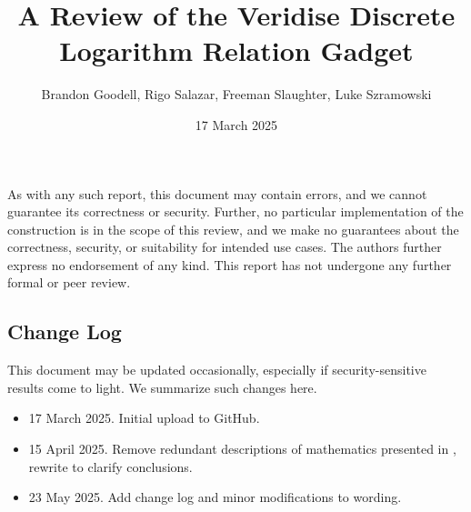 \documentclass{article}
\title{A Review of the Veridise Discrete Logarithm Relation Gadget}
\author{Brandon Goodell, Rigo Salazar, Freeman Slaughter, Luke Szramowski
}
\affil{$\mathsf{Cypher \ Stack}$}
\date{17 March 2025}
\theoremstyle{definition}
\newcommand{\6}{\mathbf}
\newcommand{\7}{\mathcal}
\begin{document}
\maketitle





As with any such report, this document may contain errors, and we cannot guarantee its correctness or security. 
Further, no particular implementation of the construction is in the scope of this review, and we make no guarantees about the correctness, security, or suitability for intended use cases.
The authors further express no endorsement of any kind. 
This report has not undergone any further formal or peer review.


\tableofcontents

\subsection*{Change Log}

This document may be updated occasionally, especially if security-sensitive results come to light. We summarize such changes here.
\begin{itemize}
\item 17 March 2025. Initial upload to GitHub.
\item 15 April 2025. Remove redundant descriptions of mathematics presented in \cite{BassaSoundnessIPDL}, rewrite to clarify conclusions.
\item 23 May 2025. Add change log and minor modifications to wording.
\end{itemize}




\end{document}
